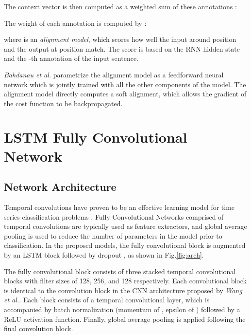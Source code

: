 \documentclass[article]{IEEEtran}
\begin{document}
The context vector  is then computed as a weighted sum of these annotations :


The weight  of each annotation  is computed by : 

where  is an \textit{alignment model}, which scores how well the input around position  and the output at position  match. The score is based on the RNN hidden state  and the -th annotation  of the input sentence. 

\textit{Bahdanau et al.}\cite{bahdanau2014neural} parametrize the alignment model  as a feedforward neural network which is jointly trained with all the other components of the model. The alignment model directly computes a soft alignment, which allows the gradient of the cost function to be backpropagated. %
 
\begin{figure*}
\center
{}
\center
\caption{The LSTM-FCN architecture. LSTM cells can be replaced by Attention LSTM cells to construct the ALSTM-FCN architecture.}
\label{fig:arch}

\end{figure*}

\section{LSTM Fully Convolutional Network}
\label{LSTMFCN}
\subsection{Network Architecture}



Temporal convolutions have proven to be an effective learning model for time series classification problems \cite{wang2017time}. Fully Convolutional Networks comprised of temporal convolutions are typically used as feature extractors, and global average pooling \cite{lin2013network} is used to reduce the number of parameters in the model prior to classification. In the proposed models, the fully convolutional block is augmented by an LSTM block followed by dropout \cite{srivastava2014dropout}, as shown in Fig.\ref{fig:arch}. 

The fully convolutional block consists of three stacked temporal convolutional blocks with filter sizes of 128, 256, and 128 respectively. Each convolutional block is identical to the convolution block in the CNN architecture proposed by \textit{Wang et al.}\cite{wang2017time}. Each block consists of a temporal convolutional layer, which is accompanied by batch normalization \cite{ioffe2015batch} (momentum of , epsilon of ) followed by a ReLU activation function. Finally, global average pooling is applied following the final convolution block. 
\end{document}
